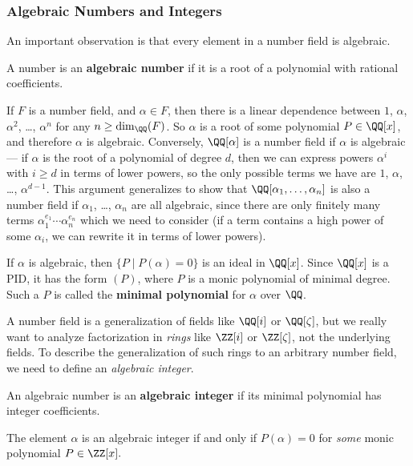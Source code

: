 \subsubsection{Algebraic Numbers and Integers}

An important observation is that every element in a number field is algebraic.

\begin{definition}
A number is an \textbf{algebraic number} if it is a root of a polynomial with rational coefficients.
\end{definition}

If $F$ is a number field, and $\alpha \in F$, then there is a linear dependence between $1$, $\alpha$, $\alpha^2$, \ldots, $\alpha^n$ for any $n \geq \dim_{\QQ}(F)$. So $\alpha$ is a root of some polynomial $P \in \QQ[x]$, and therefore $\alpha$ is algebraic. Conversely, $\QQ[\alpha]$ is a number field if $\alpha$ is algebraic --- if $\alpha$ is the root of a polynomial of degree $d$, then we can express powers $\alpha^i$ with $i \geq d$ in terms of lower powers, so the only possible terms we have are $1$, $\alpha$, \ldots, $\alpha^{d - 1}$. This argument generalizes to show that $\QQ[\alpha_1, \ldots, \alpha_n]$ is also a number field if $\alpha_1$, \ldots, $\alpha_n$ are all algebraic, since there are only finitely many terms $\alpha_1^{e_1}\cdots \alpha_n^{e_n}$ which we need to consider (if a term contains a high power of some $\alpha_i$, we can rewrite it in terms of lower powers). 

If $\alpha$ is algebraic, then $\{P \mid P(\alpha) = 0\}$ is an ideal in $\QQ[x]$. Since $\QQ[x]$ is a PID, it has the form $(P)$, where $P$ is a monic polynomial of minimal degree. Such a $P$ is called the \textbf{minimal polynomial} for $\alpha$ over $\QQ$.

A number field is a generalization of fields like $\QQ[i]$ or $\QQ[\zeta]$, but we really want to analyze factorization in \emph{rings} like $\ZZ[i]$ or $\ZZ[\zeta]$, not the underlying fields. To describe the generalization of such rings to an arbitrary number field, we need to define an \emph{algebraic integer}. 

\begin{definition}
An algebraic number is an \textbf{algebraic integer} if its minimal polynomial has integer coefficients.
\end{definition}

\begin{lemma}
The element $\alpha$ is an algebraic integer if and only if $P(\alpha) = 0$ for \emph{some} monic polynomial $P \in \ZZ[x].$ 
\end{lemma}

